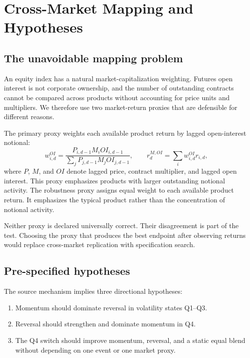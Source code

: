 \section{Cross-Market Mapping and Hypotheses}

\subsection{The unavoidable mapping problem}

An equity index has a natural market-capitalization weighting. Futures open interest is
not corporate ownership, and the number of outstanding contracts cannot be compared
across products without accounting for price units and multipliers. We therefore use two
market-return proxies that are defensible for different reasons.

The primary proxy weights each available product return by lagged open-interest notional:
\begin{equation}
  w^{OI}_{i,d}=
  \frac{P_{i,d-1}M_iOI_{i,d-1}}
  {\sum_j P_{j,d-1}M_jOI_{j,d-1}},
  \qquad
  r^{M,OI}_{d}=\sum_i w^{OI}_{i,d}r_{i,d},
  \label{eq:oi-market}
\end{equation}
where $P$, $M$, and $OI$ denote lagged price, contract multiplier, and lagged open
interest. This proxy emphasizes products with larger outstanding notional activity. The
robustness proxy assigns equal weight to each available product return. It emphasizes the
typical product rather than the concentration of notional activity.

Neither proxy is declared universally correct. Their disagreement is part of the test.
Choosing the proxy that produces the best endpoint after observing returns would replace
cross-market replication with specification search.

\subsection{Pre-specified hypotheses}

The source mechanism implies three directional hypotheses:

\begin{enumerate}
  \item Momentum should dominate reversal in volatility states Q1--Q3.
  \item Reversal should strengthen and dominate momentum in Q4.
  \item The Q4 switch should improve momentum, reversal, and a static equal blend without
  depending on one event or one market proxy.
\end{enumerate}

